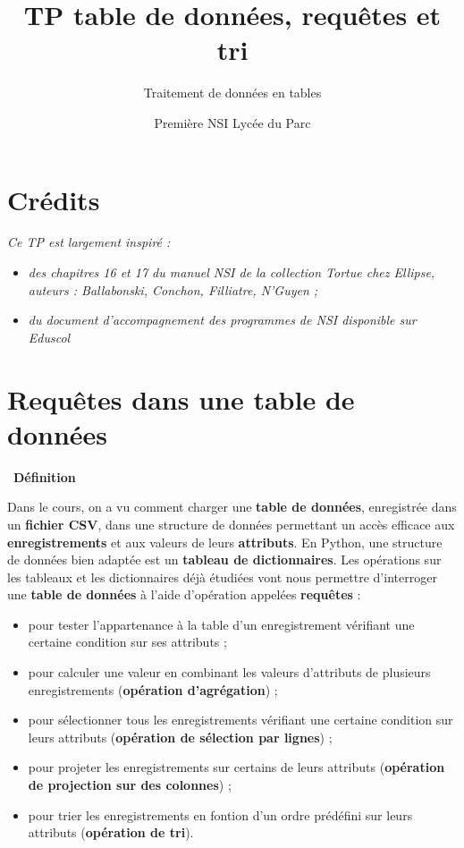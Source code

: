 \documentclass[
  11pt,
]{article}
\title{TP table de données, requêtes et tri}
\subtitle{Traitement de données en tables}
\author{Première NSI Lycée du Parc}
\date{}
\providecommand{\tightlist}{%
  \setlength{\itemsep}{0pt}\setlength{\parskip}{0pt}}
\newcounter{def}
\newenvironment{definition}[1]
{\par \medskip   \addtocounter{def}{1} \noindent  
\begin{bclogo}[arrondi =0.1,  ombre = true, barre=none, logo=\bcbook, marge=4]{~\textbf{Définition} \textbf{\thedef} {\itshape #1} }  \par}
{
\end{bclogo}
 \par \bigskip }
\newcounter{cours}
\newcounter{prog}
\begin{document}
\maketitle

\renewcommand*\contentsname{Table des matières}
{
\hypersetup{linkcolor=}
\setcounter{tocdepth}{3}
\tableofcontents
}
\hypertarget{cruxe9dits}{%
\section*{Crédits}\label{cruxe9dits}}

\emph{Ce TP est largement inspiré :}

\begin{itemize}
\tightlist
\item
  \emph{des chapitres 16 et 17 du manuel NSI de la collection Tortue
  chez Ellipse, auteurs : Ballabonski, Conchon, Filliatre, N'Guyen ;}
\item
  \emph{du document d'accompagnement des programmes de NSI disponible
  sur Eduscol}
\end{itemize}

\hypertarget{requuxeates-dans-une-table-de-donnuxe9es}{%
\section{Requêtes dans une table de
données}\label{requuxeates-dans-une-table-de-donnuxe9es}}

\begin{definition}{}

Dans le cours, on a vu comment charger une \textbf{table de données},
enregistrée dans un \textbf{fichier CSV}, dans une structure de données
permettant un accès efficace aux \textbf{enregistrements} et aux valeurs
de leurs \textbf{attributs}. En Python, une structure de données bien
adaptée est un \textbf{tableau de dictionnaires}. Les opérations sur les
tableaux et les dictionnaires déjà étudiées vont nous permettre
d'interroger une \textbf{table de données} à l'aide d'opération appelées
\textbf{requêtes} :

\begin{itemize}
\tightlist
\item
  pour tester l'appartenance à la table d'un enregistrement vérifiant
  une certaine condition sur ses attributs ;
\item
  pour calculer une valeur en combinant les valeurs d'attributs de
  plusieurs enregistrements (\textbf{opération d'agrégation}) ;
\item
  pour sélectionner tous les enregistrements vérifiant une certaine
  condition sur leurs attributs (\textbf{opération de sélection par
  lignes}) ;
\item
  pour projeter les enregistrements sur certains de leurs attributs
  (\textbf{opération de projection sur des colonnes}) ;
\item
  pour trier les enregistrements en fontion d'un ordre prédéfini sur
  leurs attributs (\textbf{opération de tri}).
\end{itemize}

\end{definition}
\end{document}
